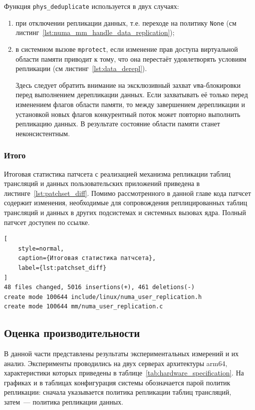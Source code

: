 Функция \texttt{phys\_deduplicate} используется в двух случаях:
\begin{enumerate}
	\item при отключении репликации данных, т.е. переходе на политику \texttt{None} (см листинг~\ref{lst:numa_mm_handle_data_replication});
	\item в системном вызове \texttt{mprotect}, если изменение прав доступа виртуальной области памяти приводит к тому, что она перестаёт удовлетворять условиям репликации (см листинг~\ref{lst:data_derepl}).

	Здесь следует обратить внимание на эксклюзивный захват \texttt{vma}-блокировки перед выполнением дерепликации данных. Если захватывать её только перед изменением флагов области памяти, то между завершением дерепликации и установкой новых флагов конкурентный поток может повторно выполнить репликацию данных. В результате состояние области памяти станет неконсистентным.
\end{enumerate}

\subsubsection{Итого}

Итоговая статистика патчсета с реализацией механизма репликации таблиц трансляций и данных пользовательских приложений приведена в листинге~\ref{lst:patchset_diff}. Помимо рассмотренного в данной главе кода патчсет содержит изменения, необходимые для сопровождения реплицированных таблиц трансляций и данных в других подсистемах и системных вызовах ядра. Полный патчсет доступен по ссылке\cite{urepl_patchset}.

\begin{lstlisting}[
	style=normal,
	caption={Итоговая статистика патчсета},
	label={lst:patchset_diff}
]
48 files changed, 5016 insertions(+), 461 deletions(-)
create mode 100644 include/linux/numa_user_replication.h
create mode 100644 mm/numa_user_replication.c
\end{lstlisting}

\subsection{Оценка производительности}

В данной части представлены результаты экспериментальных измерений и их анализ. Эксперименты проводились на двух серверах архитектуры arm64, характеристики которых приведены в таблице~\ref{tab:hardware_specification}. На графиках и в таблицах конфигурация системы обозначается парой политик репликации: сначала указывается политика репликации таблиц трансляций, затем~--- политика репликации данных.

